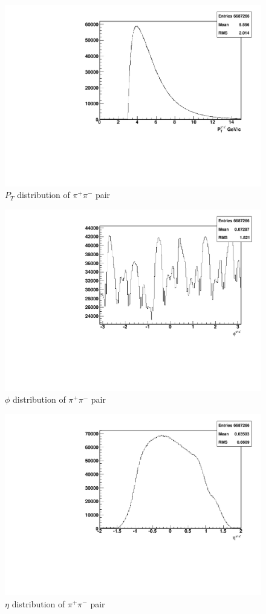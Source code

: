 \documentclass[abstract = on,listof=totoc, bibliography=totoc]{scrreprt}
\newcommand{\pip}{\pi^+}
\newcommand{\pim}{\pi^-}
\newcommand{\pair}{$\pip\pim$ }
\begin{document}
\begin{figure}
\begin{center}
\includegraphics[width = .8\textwidth]{hPtPair}
\caption[$P_{T}$ distribution of \pair pair]{$P_{T}$ distribution of \pair pair}
\label{fig:pt}
\end{center}
\end{figure}

\begin{figure}
\begin{center}
\includegraphics[width = .8\textwidth]{hPhiPair}
\caption[$\phi$ distribution of \pair pair]{$\phi$ distribution of \pair pair}
\label{fig:phi}
\end{center}
\end{figure}

\begin{figure}
\begin{center}
\includegraphics[width = .8\textwidth]{hEtaPair}
\caption[$\eta$ distribution of \pair pair]{$\eta$ distribution of \pair pair}
\label{fig:eta}
\end{center}
\end{figure}
\end{document}
